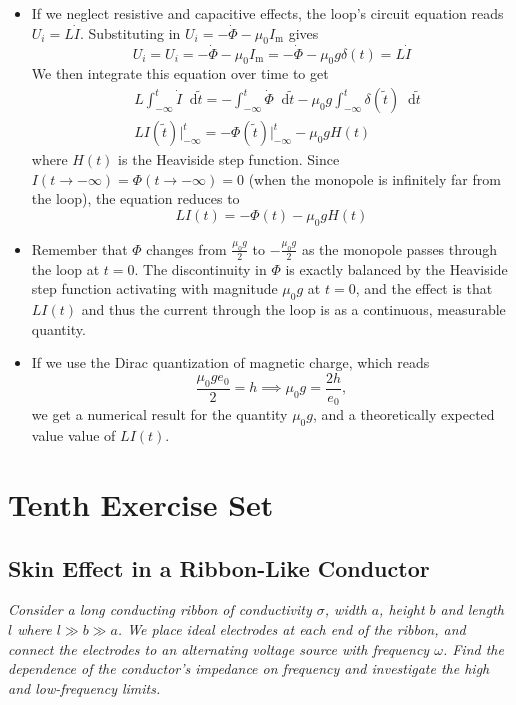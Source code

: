 \documentclass[11pt, a4paper]{article}
\newcommand{\diff}{\mathop{}\!\mathrm{d}} %
\renewcommand{\vec}[1]{\bm{#1}} %
\renewcommand{\t}[1]{\tilde{#1}} %
\newcommand{\mm}{\mu_{0}}  %
\newcommand{\m}{\vec{m}}  %
\begin{document}
\begin{itemize}
	\item If we neglect resistive and capacitive effects, the loop's circuit equation reads $ U_{i} = L \dot{I} $. Substituting in $  U_{i} = - \dot{\Phi} - \mm I_{\text{m}} $ gives
	\begin{equation*}
		U_{i} =  U_{i} = - \dot{\Phi} - \mm I_{\text{m}} = - \dot{\Phi} - \mm g \delta (t) = L \dot{I}
	\end{equation*}
	We then integrate this equation over time to get
	\begin{align*}
		&L \int_{-\infty}^{t}\dot{I}\diff \t{t} = - \int_{-\infty}^{t} \dot{\Phi} \diff \t{t} - \mm g \int_{-\infty}^{t} \delta(\t{t})\diff \t{t}\\
		&LI(\t{t}) \Big |_{-\infty}^{t} = - \Phi(\t{t}) \Big|_{-\infty}^{t} - \mm g H(t)
	\end{align*}
	where $ H(t) $ is the Heaviside step function. Since $ I(t \to -\infty) = \Phi(t \to -\infty) = 0 $ (when the monopole is infinitely far from the loop), the equation reduces to
	\begin{equation*}
		LI(t) = - \Phi(t)  - \mm gH(t)
	\end{equation*}
	
	\item Remember that $ \Phi $ changes from $ \frac{\mm g}{2} $ to $ -\frac{\mm g}{2} $ as the monopole passes through the loop at $ t = 0 $. The discontinuity in $ \Phi $ is exactly balanced by the Heaviside step function activating with magnitude $ \mm g $ at $ t = 0 $, and the effect is that $ LI(t) $ and thus the current through the loop is as a continuous, measurable quantity. 
	
	\item If we use the Dirac quantization of magnetic charge, which reads
	\begin{equation*}
		\frac{\mm g e_{0}}{2} = h \implies \mm g = \frac{2h}{e_{0}},
	\end{equation*}
	we get a numerical result for the quantity $ \mm g $, and a theoretically expected value value of $ LI(t) $.
\end{itemize}


\section{Tenth Exercise Set}

\subsection{Skin Effect in a Ribbon-Like Conductor}
\textit{Consider a long conducting ribbon of conductivity $ \sigma $, width $ a $, height $ b $ and length $ l $ where $ l \gg b \gg a $. We place ideal electrodes at each end of the ribbon, and connect the electrodes to an alternating voltage source with frequency $ \omega $. Find the dependence of the conductor's impedance on frequency and investigate the high and low-frequency limits.}
\end{document}
